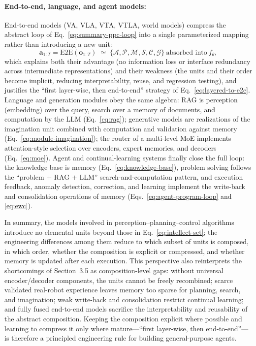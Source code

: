 \documentclass[12pt,a4paper]{article}
\newcommand{\Attn}{\mathcal{A}}
\newcommand{\Per}{\mathcal{P}}
\newcommand{\Mem}{\mathcal{M}}
\newcommand{\Srch}{\mathcal{S}}
\newcommand{\Comp}{\mathcal{C}}
\newcommand{\Imag}{\mathcal{G}}
\begin{document}
\paragraph{End-to-end, language, and agent models:}
End-to-end models (VA, VLA, VTA, VTLA, world models) compress the abstract loop of Eq.~\eqref{eq:summary-ppc-loop} into a single parameterized mapping rather than introducing a new unit:
\begin{equation}
\mathbf{a}_{1:T}=\mathrm{E2E}(\mathbf{o}_{1:T})\;\simeq\;
\{\Attn,\Per,\Mem,\Srch,\Comp,\Imag\}\ \text{absorbed into}\ f_{\theta},
\label{eq:summary-e2e}
\end{equation}
which explains both their advantage (no information loss or interface redundancy across intermediate representations) and their weakness (the units and their order become implicit, reducing interpretability, reuse, and regression testing), and justifies the ``first layer-wise, then end-to-end'' strategy of Eq.~\eqref{eq:layered-to-e2e}. Language and generation modules obey the same algebra: RAG is perception (embedding) over the query, search over a memory of documents, and computation by the LLM (Eq.~\eqref{eq:rag}); generative models are realizations of the imagination unit combined with computation and validation against memory (Eq.~\eqref{eq:module-imagination}); the router of a multi-level MoE implements attention-style selection over encoders, expert memories, and decoders (Eq.~\eqref{eq:moe}). Agent and continual-learning systems finally close the full loop: the knowledge base is memory (Eq.~\eqref{eq:knowledge-base}), problem solving follows the ``problem $+$ RAG $+$ LLM'' search-and-computation pattern, and execution feedback, anomaly detection, correction, and learning implement the write-back and consolidation operations of memory (Eqs.~\eqref{eq:agent-program-loop} and \eqref{eq:ewc}).

In summary, the models involved in perception--planning--control algorithms introduce no elemental units beyond those in Eq.~\eqref{eq:intellect-set}; the engineering differences among them reduce to which subset of units is composed, in which order, whether the composition is explicit or compressed, and whether memory is updated after each execution. This perspective also reinterprets the shortcomings of Section~3.5 as composition-level gaps: without universal encoder/decoder components, the units cannot be freely recombined; scarce validated real-robot experience leaves memory too sparse for planning, search, and imagination; weak write-back and consolidation restrict continual learning; and fully fused end-to-end models sacrifice the interpretability and reusability of the abstract composition. Keeping the composition explicit where possible and learning to compress it only where mature---``first layer-wise, then end-to-end''---is therefore a principled engineering rule for building general-purpose agents.
\end{document}
